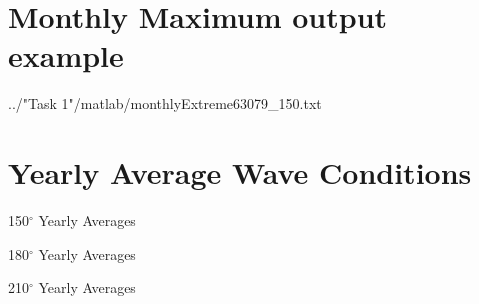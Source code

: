 \documentclass[10pt,letterpaper,titlepage]{report}
\begin{document}
\begin{appendices}
\section{Monthly Maximum output example}
 {../"Task 1"/matlab/monthlyExtreme63079_150.txt}

\section{Yearly Average Wave Conditions}

\begin{minipage}{0.36\textwidth}
\begin{table}[H]
	
	\label{yearly150}
	\caption{150$^\circ$ Yearly Averages}
\end{table}
\end{minipage}
\begin{minipage}{0.36\textwidth}
\begin{table}[H]
	
	\label{yearly180}
	\caption{180$^\circ$ Yearly Averages}
\end{table}
\end{minipage}
\begin{minipage}{0.36\textwidth}
\begin{table}[H]
	
	\label{yearly210}
	\caption{210$^\circ$ Yearly Averages}
\end{table}
\end{minipage}

\end{appendices}
\end{document}
